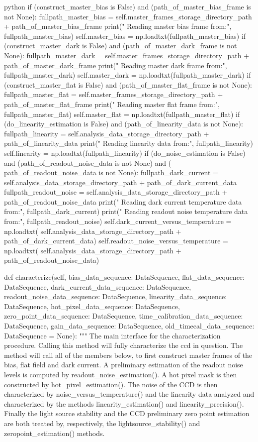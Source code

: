 \documentclass[../main.tex]{subfiles}
\begin{document}
\begin{mintedbox}{python}
if (construct_master_bias is False) and (path_of_master_bias_frame is not None):
fullpath_master_bias  =  self.master_frames_storage_directory_path + path_of_master_bias_frame
print(" Reading master bias frame from:\n ", fullpath_master_bias)
self.master_bias  =  np.loadtxt(fullpath_master_bias)
if (construct_master_dark is False) and (path_of_master_dark_frame is not None):
fullpath_master_dark  =  self.master_frames_storage_directory_path + path_of_master_dark_frame
print(" Reading master dark frame from:\n ", fullpath_master_dark)
self.master_dark  =  np.loadtxt(fullpath_master_dark)
if (construct_master_flat is False) and (path_of_master_flat_frame is not None):
fullpath_master_flat  =  self.master_frames_storage_directory_path + path_of_master_flat_frame
print(" Reading master flat frame from:\n ", fullpath_master_flat)
self.master_flat  =  np.loadtxt(fullpath_master_flat)
if (do_linearity_estimation is False) and (path_of_linearity_data is not None):
fullpath_linearity  =  self.analysis_data_storage_directory_path + path_of_linearity_data
print(" Reading linearity data from:\n ", fullpath_linearity)
self.linearity  =  np.loadtxt(fullpath_linearity)
if (do_noise_estimation is False) and (path_of_readout_noise_data is not None) and (
path_of_readout_noise_data is not None):
fullpath_dark_current  =  self.analysis_data_storage_directory_path + path_of_dark_current_data
fullpath_readout_noise  =  self.analysis_data_storage_directory_path + path_of_readout_noise_data
print(" Reading dark current temperature data from:\n ", fullpath_dark_current)
print(" Reading readout noise temperature data from:\n ", fullpath_readout_noise)
self.dark_current_versus_temperature  =  np.loadtxt(
self.analysis_data_storage_directory_path + path_of_dark_current_data)
self.readout_noise_versus_temperature  =  np.loadtxt(
self.analysis_data_storage_directory_path + path_of_readout_noise_data)

def characterize(self,
bias_data_sequence: DataSequence,
flat_data_sequence: DataSequence,
dark_current_data_sequence: DataSequence,
readout_noise_data_sequence: DataSequence,
linearity_data_sequence: DataSequence,
hot_pixel_data_sequence: DataSequence,
zero_point_data_sequence: DataSequence,
time_calibration_data_sequence: DataSequence,
gain_data_sequence: DataSequence,
old_timecal_data_sequence: DataSequence  =  None):
"""
The main interface for the characterization procedure. Calling this
method will fully characterize the ccd in question. The method will
call all of the members below, to first construct master frames of
the bias, flat field and dark current. A preliminary estimation of
the readout noise levels is computed by readout_noise_estimation().
A hot pixel mask is then constructed by hot_pixel_estimation().
The noise of the CCD is then characterized by noise_versus_temperature()
and the linearity data analyzed and characterized by the methods
linearity_estimation() and linearity_precision(). Finally the light
source stability and the CCD preliminary zero point estimation are
both treated by, respectively, the lightsource_stability() and
zeropoint_estimation() methods.


\end{mintedbox}
\end{document}
